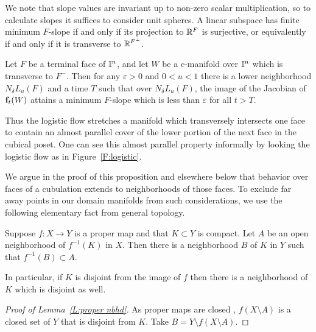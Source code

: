We note that slope values are invariant up to non-zero scalar multiplication, so to calculate slopes it suffices to consider unit spheres.
A linear subspace has finite  minimum $F$-slope if and only if its projection to $\mathbb{R}^F$ is surjective, or equivalently if and only if it is transverse to $\mathbb{R}^{F^\perp}$.


\begin{proposition}\label{Wapproxparallel}
Let $F$ be a terminal face of $\mathbb{I}^n$, and let $W$ be a c-manifold over $\mathbb{I}^n$ which is transverse to
$F^-$.  Then for any $\varepsilon > 0$ and $0 < u < 1$
there is a lower neighborhood $N_\delta L_u(F)$ and a time $T$ such that over
$N_\delta L_u(F)$,  the image of the Jacobian of $\mathbf{f}_t(W)$ attains a minimum $F$-slope
 which is less than $\varepsilon$ for all $t > T$.
\end{proposition}

Thus the logistic flow stretches a manifold which transversely intersects one face to contain
 an almost parallel cover of the lower portion of the next face in the cubical poset.  One can see
this almost parallel property informally by looking the logistic flow as in Figure~\ref{F:logistic}.

We argue in the proof of this proposition and elsewhere below that behavior over faces of a cubulation
extends to neighborhoods of those faces.
To exclude far away points in our  domain manifolds from such considerations, we use the following elementary fact from general topology.

\begin{lemma}\label{L:proper nbhd}
	Suppose $f \colon X \to Y$ is a proper map and that $K \subset Y$ is compact.
	Let $A$ be an open neighborhood of $f^{-1}(K)$ in $X$.
	Then there is a neighborhood $B$ of $K$ in $Y$ such that $f^{-1}(B) \subset A$.
	\end{lemma}

	In particular, if $K$ is disjoint from the image of $f$ then there is a neighborhood of $K$ which is disjoint as well.

\begin{proof}[Proof of Lemma~\ref{L:proper nbhd}]
	As proper maps are closed \cite[Proposition I.10.1.1]{Bou98}, $f(X \setminus A)$ is a closed set of $Y$ that is disjoint from $K$.
	Take $B = Y \setminus f(X \setminus A)$.
\end{proof}


